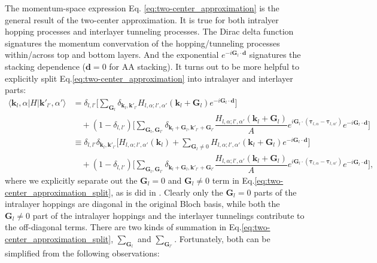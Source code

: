 The momentum-space expression Eq. \eqref{eq:two-center_approximation} is the general result of the two-center approximation. It is true for both intralyer hopping processes and interlayer tunneling processes. The Dirac delta function signatures the momentum convervation of the hopping/tunneling processes within/across top and bottom layers. And the exponential $e^{-i\bm G_l\cdot\bm d}$ signatures the stacking dependence ($\bm d=0$ for AA stacking). It turns out to be more helpful to explicitly split Eq.\eqref{eq:two-center_approximation} into intralayer and interlayer parts:
\begin{align}
    \langle \bm k_l,\alpha|H|\bm k'_{l'},\alpha'\rangle & = \delta_{l,l'}\bigg[\sum_{\bm G_l}\delta_{\bm k_l,\bm k'_{l'}}H_{l,\alpha;l',\alpha'}(\bm k_l+\bm G_l)e^{-i\bm G_l\cdot\bm d}\bigg]\nonumber                                                                                                                                              \\
                                                        & \quad +(1-\delta_{l,l'})\bigg[\sum_{\bm G_l,\bm G_{l'}}\delta_{\bm k_l+\bm G_l,\bm k'_{l'}+\bm G_{l'}}\dfrac{H_{l,\alpha;l',\alpha'}(\bm k_l+\bm G_l)}{A} e^{i\bm G_l\cdot(\bm\tau_{l,\alpha}-\bm\tau_{l,\alpha'})}e^{-i\bm G_l\cdot\bm d}\bigg]\nonumber                                  \\
                                                        & \equiv\delta_{l,l'}\delta_{\bm k_l,\bm k'_{l'}}\bigg[H_{l,\alpha;l',\alpha'}(\bm k_l) + \sum_{\bm G_l\neq0}H_{l,\alpha;l',\alpha'}(\bm k_l+\bm G_l)e^{-i\bm G_l\cdot\bm d}\bigg]\nonumber                                                                                                  \\
                                                        & \quad +(1-\delta_{l,l'})\bigg[\sum_{\bm G_l,\bm G_{l'}}\delta_{\bm k_l+\bm G_l,\bm k'_{l'}+\bm G_{l'}}\dfrac{H_{l,\alpha;l',\alpha'}(\bm k_l+\bm G_l)}{A} e^{i\bm G_l\cdot(\bm\tau_{l,\alpha}-\bm\tau_{l,\alpha'})}e^{-i\bm G_l\cdot\bm d}\bigg],\label{eq:two-center_approximation_split}
\end{align}
where we explicitly separate out the $\bm G_l=0$ and $\bm G_l\neq0$ term in Eq.\eqref{eq:two-center_approximation_split}, as is did in \cite{jung2014ab}. Clearly only the $\bm G_l=0$ parts of the intralayer hoppings are diagonal in the original Bloch basis, while both the $\bm G_l\neq0$ part of the intralayer hoppings and the interlayer tunnelings contribute to the off-diagonal terms. There are two kinds of summation in Eq.\eqref{eq:two-center_approximation_split}, $\sum_{\bm G_l}$ and $\sum_{\bm G_{l'}}$. Fortunately, both can be simplified from the following observations:

